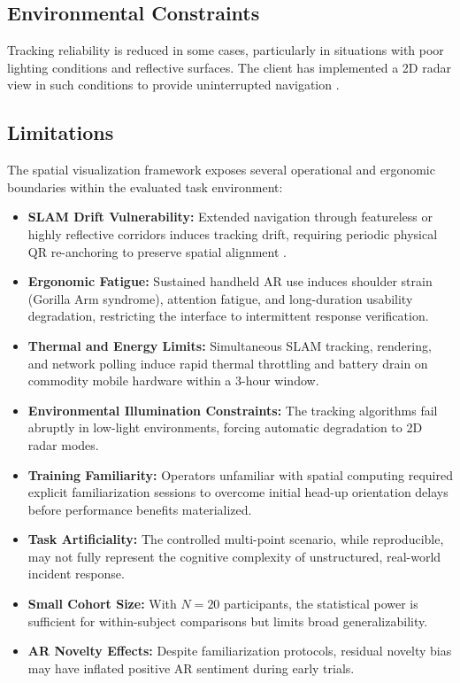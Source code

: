 \documentclass[conference]{IEEEtran}
\begin{document}
\subsection{Environmental Constraints}
Tracking reliability is reduced in some cases, particularly in situations with poor lighting conditions and reflective surfaces. The client has implemented a 2D radar view in such conditions to provide uninterrupted navigation \cite{b24}.

\subsection{Limitations}
The spatial visualization framework exposes several operational and ergonomic boundaries within the evaluated task environment:
\begin{itemize}
    \item \textbf{SLAM Drift Vulnerability:} Extended navigation through featureless or highly reflective corridors induces tracking drift, requiring periodic physical QR re-anchoring to preserve spatial alignment \cite{b15}.
    \item \textbf{Ergonomic Fatigue:} Sustained handheld AR use induces shoulder strain (Gorilla Arm syndrome), attention fatigue, and long-duration usability degradation, restricting the interface to intermittent response verification.
    \item \textbf{Thermal and Energy Limits:} Simultaneous SLAM tracking, rendering, and network polling induce rapid thermal throttling and battery drain on commodity mobile hardware within a 3-hour window.
    \item \textbf{Environmental Illumination Constraints:} The tracking algorithms fail abruptly in low-light environments, forcing automatic degradation to 2D radar modes.
    \item \textbf{Training Familiarity:} Operators unfamiliar with spatial computing required explicit familiarization sessions to overcome initial head-up orientation delays before performance benefits materialized.
    \item \textbf{Task Artificiality:} The controlled multi-point scenario, while reproducible, may not fully represent the cognitive complexity of unstructured, real-world incident response.
    \item \textbf{Small Cohort Size:} With $N=20$ participants, the statistical power is sufficient for within-subject comparisons but limits broad generalizability.
    \item \textbf{AR Novelty Effects:} Despite familiarization protocols, residual novelty bias may have inflated positive AR sentiment during early trials.
\end{itemize}
\end{document}
